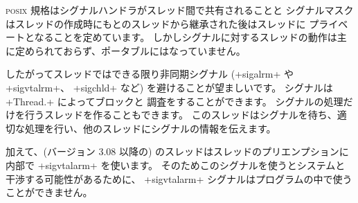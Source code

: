 \textsc{posix} 規格はシグナルハンドラがスレッド間で共有されることと
シグナルマスクはスレッドの作成時にもとのスレッドから継承された後はスレッドに
プライベートとなることを定めています。
しかしシグナルに対するスレッドの動作は主に定められておらず、ポータブルにはなっていません。

したがってスレッドではできる限り非同期シグナル
(\ml+sigalrm+ や \ml+sigvtalrm+、 \ml+sigchld+ など) を避けることが望ましいです。
シグナルは \ml+Thread.+ によってブロックと
調査をすることができます。
シグナルの処理だけを行うスレッドを作ることもできます。
このスレッドはシグナルを待ち、適切な処理を行い、他のスレッドにシグナルの情報を伝えます。

加えて、(バージョン 3.08 以降の) \ocaml のスレッドはスレッドのプリエンプションに
内部で \ml+sigvtalarm+ を使います。
そのためこのシグナルを使うとシステムと干渉する可能性があるために、
\ml+sigvtalarm+ シグナルはプログラムの中で使うことができません。

